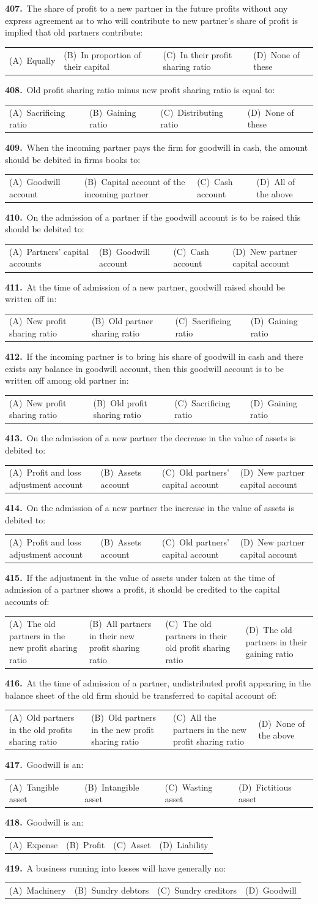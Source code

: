 \documentclass[11pt,a4paper]{article}
\makeatletter
\newcommand{\mcq}[6]{%
  \Needspace{4\baselineskip}%
  \par\medskip\noindent\textbf{#1.}\ #2\par\nopagebreak
  \noindent\begin{tabularx}{\linewidth}{@{\hspace{1.5em}}*{4}{>{\raggedright\arraybackslash}X}@{}}
    (A)~#3 & (B)~#4 & (C)~#5 & (D)~#6
  \end{tabularx}\par}
\makeatother
\begin{document}
\mcq{407}{The share of profit to a new partner in the future profits without any express agreement as to who will contribute to new partner’s share of profit is implied that old partners contribute:}{Equally}{In proportion of their capital}{In their profit sharing ratio}{None of these}
\mcq{408}{Old profit sharing ratio minus new profit sharing ratio is equal to:}{Sacrificing ratio}{Gaining ratio}{Distributing ratio}{None of these}
\mcq{409}{When the incoming partner pays the firm for goodwill in cash, the amount should be debited in firms books to:}{Goodwill account}{Capital account of the incoming partner}{Cash account}{All of the above}
\mcq{410}{On the admission of a partner if the goodwill account is to be raised this should be debited to:}{Partners’ capital accounts}{Goodwill account}{Cash account}{New partner capital account}
\mcq{411}{At the time of admission of a new partner, goodwill raised should be written off in:}{New profit sharing ratio}{Old partner sharing ratio}{Sacrificing ratio}{Gaining ratio}
\mcq{412}{If the incoming partner is to bring his share of goodwill in cash and there exists any balance in goodwill account, then this goodwill account is to be written off among old partner in:}{New profit sharing ratio}{Old profit sharing ratio}{Sacrificing ratio}{Gaining ratio}
\mcq{413}{On the admission of a new partner the decrease in the value of assets is debited to:}{Profit and loss adjustment account}{Assets account}{Old partners’ capital account}{New partner capital account}
\mcq{414}{On the admission of a new partner the increase in the value of assets is debited to:}{Profit and loss adjustment account}{Assets account}{Old partners’ capital account}{New partner capital account}
\mcq{415}{If the adjustment in the value of assets under taken at the time of admission of a partner shows a profit, it should be credited to the capital accounts of:}{The old partners in the new profit sharing ratio}{All partners in their new profit sharing ratio}{The old partners in their old profit sharing ratio}{The old partners in their gaining ratio}
\mcq{416}{At the time of admission of a partner, undistributed profit appearing in the balance sheet of the old firm should be transferred to capital account of:}{Old partners in the old profits sharing ratio}{Old partners in the new profit sharing ratio}{All the partners in the new profit sharing ratio}{None of the above}
\mcq{417}{Goodwill is an:}{Tangible asset}{Intangible asset}{Wasting asset}{Fictitious asset}
\mcq{418}{Goodwill is an:}{Expense}{Profit}{Asset}{Liability}
\mcq{419}{A business running into losses will have generally no:}{Machinery}{Sundry debtors}{Sundry creditors}{Goodwill}
\end{document}
